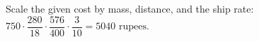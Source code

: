 Scale the given cost by mass, distance, and the ship rate: $750\cdot\dfrac{280}{18}\cdot\dfrac{576}{400}\cdot\dfrac{3}{10}=\boxed{5040\text{ rupees}}$.
